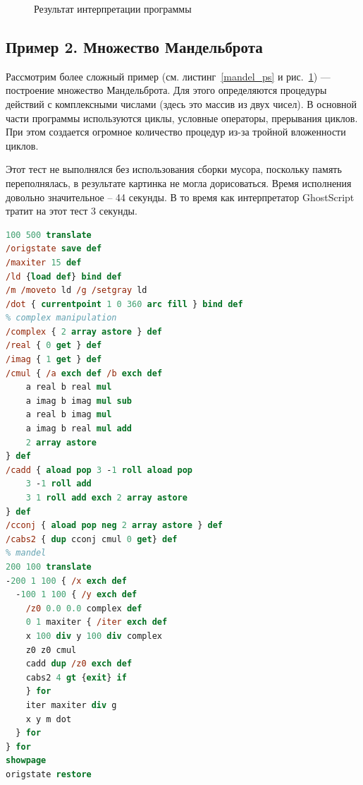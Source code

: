 \begin{figure}[t]
\caption{Результат интерпретации программы}\label{mandelprotset}
\end{figure}

\subsection{Пример 2. Множество Мандельброта}
Рассмотрим более сложный пример (см. листинг~\ref{mandel_ps} и рис.~\ref{mandelprotset}) --- построение множество Мандельброта. Для этого определяются процедуры действий с комплексными числами (здесь это массив из двух чисел). В основной части программы используются циклы, условные операторы, прерывания циклов. При этом создается огромное количество процедур из-за тройной вложенности циклов.

Этот тест не выполнялся без использования сборки мусора, поскольку память переполнялась, в результате картинка не могла дорисоваться. Время исполнения  довольно значительное -- 44 секунды. В то время как интерпретатор GhostScript тратит на этот тест 3 секунды.

\begin{lstlisting}[label=mandel_ps,caption=Множество Мандельброта, frame = none, language = PostScript]
100 500 translate
/origstate save def
/maxiter 15 def
/ld {load def} bind def
/m /moveto ld /g /setgray ld
/dot { currentpoint 1 0 360 arc fill } bind def
% complex manipulation
/complex { 2 array astore } def
/real { 0 get } def
/imag { 1 get } def
/cmul { /a exch def /b exch def
    a real b real mul
    a imag b imag mul sub
    a real b imag mul
    a imag b real mul add
    2 array astore
} def
/cadd { aload pop 3 -1 roll aload pop
    3 -1 roll add
    3 1 roll add exch 2 array astore
} def
/cconj { aload pop neg 2 array astore } def
/cabs2 { dup cconj cmul 0 get} def
% mandel
200 100 translate
-200 1 100 { /x exch def
  -100 1 100 { /y exch def
    /z0 0.0 0.0 complex def
    0 1 maxiter { /iter exch def
    x 100 div y 100 div complex
    z0 z0 cmul
    cadd dup /z0 exch def
    cabs2 4 gt {exit} if
    } for
    iter maxiter div g
    x y m dot
  } for
} for
showpage
origstate restore
\end{lstlisting}

